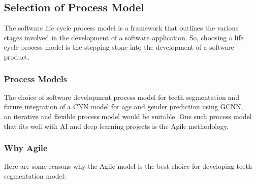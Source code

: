 \vspace{0.25cm}
\subsection{ Selection of Process Model}
The software life cycle process model is a framework that outlines the various stages involved in the development of a software application. So, choosing a life cycle process model is the stepping stone into the development of a software product.

\subsubsection{ Process Models}
The choice of software development process model for teeth segmentation and future integration of a CNN model for age and gender prediction using GCNN, an iterative and flexible process model would be suitable. One such process model that fits well with AI and deep learning projects is the Agile methodology.

\subsubsection{Why Agile}
Here are some reasons why the Agile model is the best choice for developing teeth segmentation model:

